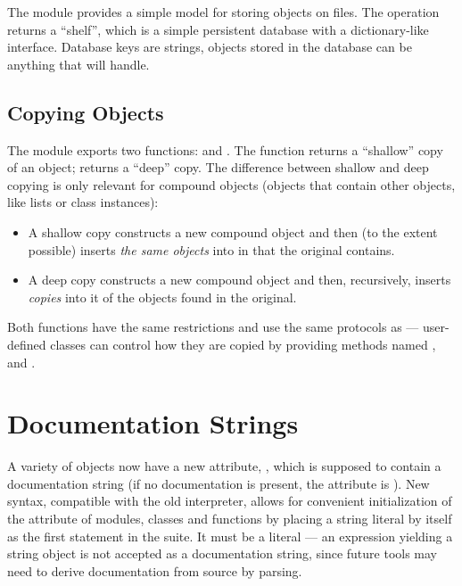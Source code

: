 The module  provides a simple model for storing objects
on files.  The operation  returns a
``shelf'', which is a simple persistent database with a
dictionary-like interface.  Database keys are strings, objects stored
in the database can be anything that  will handle.

\subsection{Copying Objects}

The module  exports two functions:  and
.  The  function returns a ``shallow''
copy of an object;  returns a ``deep'' copy.  The
difference between shallow and deep copying is only relevant for
compound objects (objects that contain other objects, like lists or
class instances):

\begin{itemize}

\item
A shallow copy constructs a new compound object and then (to the
extent possible) inserts {\em the same objects} into in that the
original contains.

\item
A deep copy constructs a new compound object and then, recursively,
inserts {\em copies} into it of the objects found in the original.

\end{itemize}

Both functions have the same restrictions and use the same protocols
as  --- user-defined classes can control how they are
copied by providing methods named ,
 and .


\section{Documentation Strings}

A variety of objects now have a new attribute, , which
is supposed to contain a documentation string (if no documentation is
present, the attribute is ).  New syntax, compatible with
the old interpreter, allows for convenient initialization of the
 attribute of modules, classes and functions by placing
a string literal by itself as the first statement in the suite.  It
must be a literal --- an expression yielding a string object is not
accepted as a documentation string, since future tools may need to
derive documentation from source by parsing.

